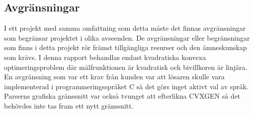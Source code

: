 \subsection{Avgränsningar}
I ett projekt med samma omfattning som detta måste det finnas avgränsningar som begränsar projektet i olika avseenden. De avgränsningar eller begränsningar som finns i detta projekt rör främst tillgängliga resurser och den ämneskunskap som krävs.
\newline
\newline
I denna rapport behandlas endast kvadratiska konvexa optimeringsproblem där målfrunktionen är kvadratisk och bivillkoren är linjära. En avgränsning som var ett krav från kunden var att lösaren skulle vara implementerad i programmeringsspråket C så det görs inget aktivt val av språk. Parserns grafiska gränssnitt var också tvunget att efterlikna CVXGEN så det behövdes inte tas fram ett nytt gränssnitt. 

